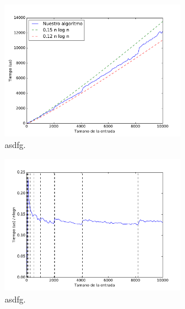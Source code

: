 \begin{figure}[H]
 \centering
	\includegraphics[width=0.7\textwidth]{img/tiempos/kaioken1.pdf}
	\caption{\footnotesize asdfg.}
	\label{fig:kaioken-tiempos1}
\end{figure}

\begin{figure}[H]
 \centering
	\includegraphics[width=0.7\textwidth]{img/tiempos/kaioken2.pdf}
	\caption{\footnotesize asdfg.}
	\label{fig:kaioken-tiempos2}
\end{figure}
